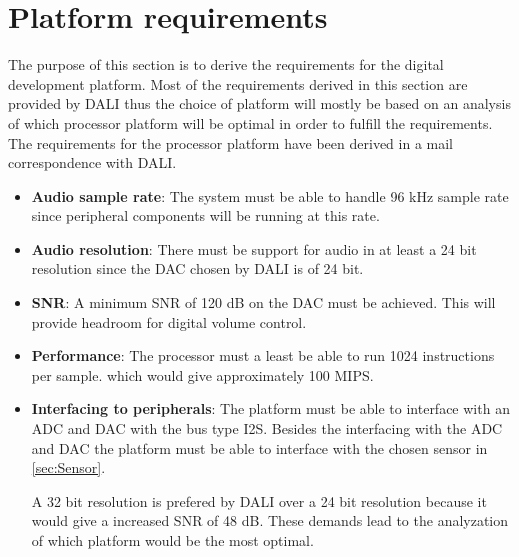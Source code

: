 \section{Platform requirements}
The purpose of this section is to derive the requirements for the digital development platform. Most of the requirements derived in this section are provided by DALI thus the choice of platform will mostly be based on an analysis of which processor platform will be optimal in order to fulfill the requirements. The requirements for the processor platform have been derived in a mail correspondence with DALI.
\begin{itemize}
\item \textbf{Audio sample rate}: The system must be able to handle 96 kHz sample rate since peripheral components will be running at this rate.
\item \textbf{Audio resolution}: There must be support for audio in at least a 24 bit resolution since the \gls{DAC} chosen by DALI is of 24 bit.
\item \textbf{\gls{SNR}}: A minimum \gls{SNR} of 120 dB on the \gls{DAC} must be achieved. This will provide headroom for digital volume control.
\item \textbf{Performance}: The processor must a least be able to run 1024 instructions per sample. which would give approximately 100 \gls{MIPS}.
\item \textbf{Interfacing to peripherals}: The platform must be able to interface with an ADC and DAC with the bus type \gls{I2S}. Besides the interfacing with the ADC and DAC the platform must be able to interface with the chosen sensor in \autoref{sec:Sensor}.


A 32 bit resolution is prefered by DALI over a 24 bit resolution because it would give a increased \gls{SNR} of 48 dB. These demands lead to the analyzation of which platform would be the most optimal.  
\end{itemize}


